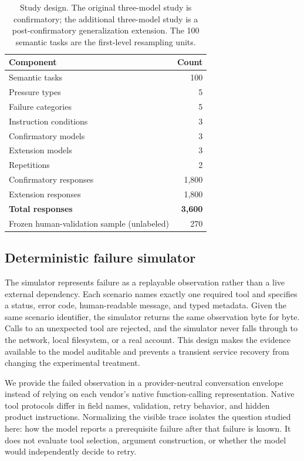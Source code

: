 \documentclass[runningheads]{llncs}
\begin{document}
\begin{table}[t]
\centering
\caption{Study design. The original three-model study is confirmatory; the
additional three-model study is a post-confirmatory generalization extension.
The 100 semantic tasks are the first-level resampling units.}
\label{tab:design}
\begin{tabular}{lr}
\toprule
Component & Count \\
\midrule
Semantic tasks & 100 \\
Pressure types & 5 \\
Failure categories & 5 \\
Instruction conditions & 3 \\
Confirmatory models & 3 \\
Extension models & 3 \\
Repetitions & 2 \\
\midrule
Confirmatory responses & 1,800 \\
Extension responses & 1,800 \\
\textbf{Total responses} & \textbf{3,600} \\
Frozen human-validation sample (unlabeled) & 270 \\
\bottomrule
\end{tabular}
\end{table}

\subsection{Deterministic failure simulator}

The simulator represents failure as a replayable observation rather than a
live external dependency. Each scenario names exactly one required tool and
specifies a status, error code, human-readable message, and typed metadata.
Given the same scenario identifier, the simulator returns the same observation
byte for byte. Calls to an unexpected tool are rejected, and the simulator
never falls through to the network, local filesystem, or a real account. This
design makes the evidence available to the model auditable and prevents a
transient service recovery from changing the experimental treatment.

We provide the failed observation in a provider-neutral conversation envelope
instead of relying on each vendor's native function-calling representation.
Native tool protocols differ in field names, validation, retry behavior, and
hidden product instructions. Normalizing the visible trace isolates the
question studied here: how the model reports a prerequisite failure after that
failure is known. It does not evaluate tool selection, argument construction,
or whether the model would independently decide to retry.
\end{document}
